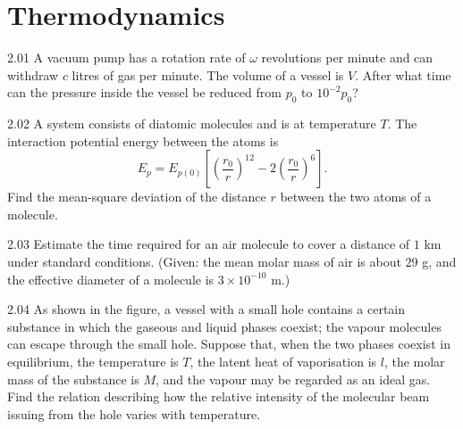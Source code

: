 \section{Thermodynamics}

\begin{problem}{2.01}
A vacuum pump has a rotation rate of $\omega$ revolutions per minute and can withdraw $c$ litres of gas per minute. The volume of a vessel is $V$. After what time can the pressure inside the vessel be reduced from $p_0$ to $10^{-2}p_0$?
\end{problem}

\begin{problem}{2.02}
A system consists of diatomic molecules and is at temperature $T$. The interaction potential energy between the atoms is
\[
E_p = E_{p(0)}\left[\left(\frac{r_0}{r}\right)^{12}-2\left(\frac{r_0}{r}\right)^{6}\right].
\]
Find the mean-square deviation of the distance $r$ between the two atoms of a molecule.
\end{problem}

\begin{problem}{2.03}
Estimate the time required for an air molecule to cover a distance of $1$ km under standard conditions. (Given: the mean molar mass of air is about $29$ g, and the effective diameter of a molecule is $3\times10^{-10}$ m.)
\end{problem}

\begin{problem}{2.04}
As shown in the figure, a vessel with a small hole contains a certain substance in which the gaseous and liquid phases coexist; the vapour molecules can escape through the small hole. Suppose that, when the two phases coexist in equilibrium, the temperature is $T$, the latent heat of vaporisation is $l$, the molar mass of the substance is $M$, and the vapour may be regarded as an ideal gas. Find the relation describing how the relative intensity of the molecular beam issuing from the hole varies with temperature.
\end{problem}

